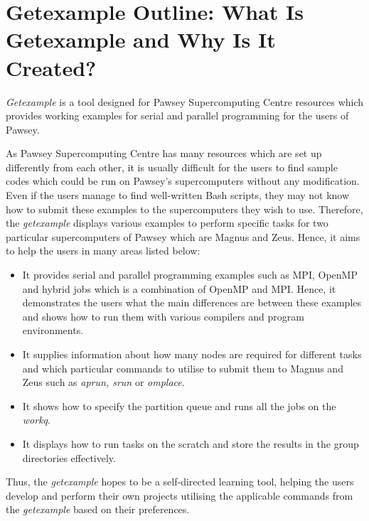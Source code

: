 \section{Getexample Outline: What Is Getexample and Why Is It Created?}

\emph{Getexample} is a tool designed for Pawsey Supercomputing Centre resources which provides working examples for serial and parallel programming for
the users of Pawsey. 

As Pawsey Supercomputing Centre has many resources which are set up differently from each other, it is usually difficult for the users to find sample 
codes which could be run on Pawsey's supercomputers without any modification. Even if the users manage to find well-written Bash scripts, they may not 
know how to submit these examples to the supercomputers they wish to use. Therefore, the \emph{getexample} displays various examples to perform specific 
tasks for two particular supercomputers of Pawsey which are Magnus and Zeus. Hence, it aims to help the users in many areas listed below:

\begin{itemize}
\item It provides serial and parallel programming examples such as MPI, OpenMP and hybrid jobs which is a combination of OpenMP and MPI. Hence, it 
demonstrates the users what the main differences are between these examples and shows how to run them with various compilers and program environments.
\item It supplies information about how many nodes are required for different tasks and which particular commands to utilise to submit them to 
Magnus and Zeus such as \emph{aprun, srun} or \emph{omplace}. 
\item It shows how to specify the partition queue and runs all the jobs on the \emph{workq}.
\item It displays how to run tasks on the scratch and store the results in the group directories effectively.
\end{itemize}   

Thus, the \emph{getexample} hopes to be a self-directed learning tool, helping the users develop and perform their own projects utilising the applicable
commands from the \emph{getexample} based on their preferences. 
